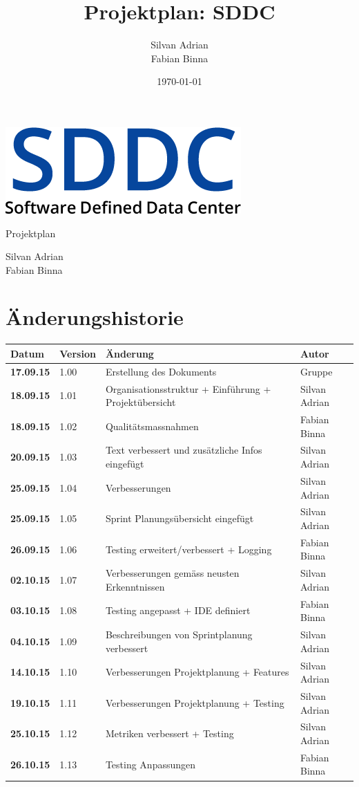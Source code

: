 \documentclass[11pt]{scrartcl}
\title{Projektplan: SDDC}
\author{Silvan Adrian \\ Fabian Binna}
\date{\today{}}
\begin{document}
\def\arraystretch{1.5}
\begin{titlepage}
\begin{center}
\vspace{10em}
\includegraphics[scale=2]{SDDC}
\vspace{10em}
\end{center}
\begin{center}
\huge {Projektplan}
\end{center}
\begin{center}
\vspace{10em}
\LARGE {Silvan Adrian} \\
\LARGE {Fabian Binna}
\end{center}

\end{titlepage}

\newpage
\section{Änderungshistorie}
\begin{tabularx}{\textwidth}{l l X l}
\textbf{Datum} & \textbf{Version} & \textbf{Änderung}  & \textbf{Autor} \\
\hline
\textbf{17.09.15} & 1.00 & Erstellung des Dokuments & Gruppe \\
\textbf{18.09.15} & 1.01 & Organisationsstruktur + Einführung + 
Projektübersicht & Silvan Adrian\\
\textbf{18.09.15} & 1.02 & Qualitätsmassnahmen & Fabian Binna\\
\textbf{20.09.15} & 1.03 &  Text verbessert und zusätzliche Infos eingefügt & Silvan Adrian\\
\textbf{25.09.15} & 1.04 & Verbesserungen & Silvan Adrian\\
\textbf{25.09.15} & 1.05 & Sprint Planungsübersicht eingefügt & Silvan Adrian\\
\textbf{26.09.15} & 1.06 & Testing erweitert/verbessert + Logging & Fabian 
Binna\\
\textbf{02.10.15} & 1.07 & Verbesserungen gemäss neusten Erkenntnissen & Silvan 
Adrian\\
\textbf{03.10.15} & 1.08 & Testing angepasst + IDE definiert & Fabian Binna\\
\textbf{04.10.15} & 1.09 & Beschreibungen von Sprintplanung verbessert & Silvan 
Adrian\\
\textbf{14.10.15} & 1.10 &  Verbesserungen Projektplanung + Features & Silvan 
Adrian\\
\textbf{19.10.15} & 1.11 &  Verbesserungen Projektplanung + Testing & Silvan 
Adrian\\
\textbf{25.10.15} & 1.12 &  Metriken verbessert + Testing & Silvan 
Adrian\\
\textbf{26.10.15} & 1.13 & Testing Anpassungen & Fabian Binna\\
\end{tabularx}
\end{document}
